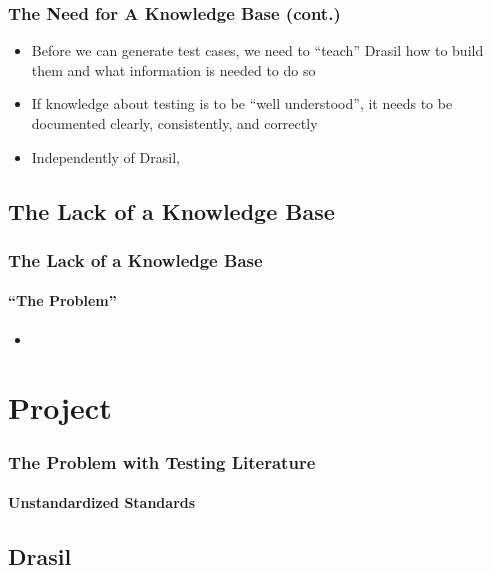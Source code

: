 \documentclass{beamer}
\begin{document}
\begin{frame}
    \frametitle{The Need for A Knowledge Base (cont.)}
    \begin{itemize}
        \item Before we can generate test cases, we need to ``teach'' Drasil
              how to build them and what information is needed to do so
        \item If knowledge about testing is to be ``well understood'', it needs
              to be documented clearly, consistently, and correctly
        \item<2-> Independently of Drasil, \litStd{}
    \end{itemize}
\end{frame}

\subsection{The Lack of a Knowledge Base}

\begin{frame}
    \frametitle{The Lack of a Knowledge Base}
    \framesubtitle{``The Problem''}
    \begin{itemize}
        \item \badTaxonomies{}
    \end{itemize}
\end{frame}


\section{Project}

\begin{frame}
    \frametitle{The Problem with Testing Literature}
    \framesubtitle{Unstandardized Standards}
\end{frame}

\subsection{Drasil}

\end{document}
